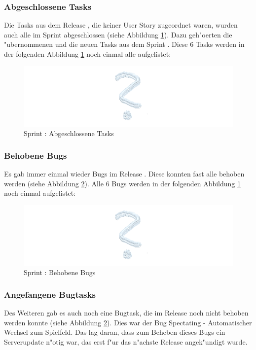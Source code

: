 \documentclass[12pt, titlepage]{scrartcl}
\newcommand{\RN}[1]{%
	\textup{\uppercase\expandafter{\romannumeral#1}}%
}
\begin{document}
    		\subsubsection{Abgeschlossene Tasks}
    			Die Tasks aus dem Release \RN{3}, die keiner User Story zugeordnet waren, wurden auch alle im Sprint \RN{5} abgeschlossen (siehe Abbildung \ref{Done_Tasks_6}). Dazu geh"oerten die "ubernommenen und die neuen Tasks aus dem Sprint \RN{6}. Diese 6 Tasks werden in der folgenden Abbildung \ref{Done_Tasks_6} noch einmal alle aufgelistet:
    			\begin{figure}[H]
    				\centering
    				\includegraphics[width=\textwidth]{images/sprintVI/doneTasks.png}
    				\caption{Sprint \RN{6}: Abgeschlossene Tasks}
    				\label{Done_Tasks_6}
    			\end{figure}
    		\subsubsection{Behobene Bugs}
    			Es gab immer einmal wieder Bugs im Release \RN{3}. Diese konnten fast alle behoben werden (siehe Abbildung \ref{Fixed_Bugs_6}). Alle 6 Bugs werden in der folgenden Abbildung \ref{Done_Tasks_6} noch einmal aufgelistet:
    			\begin{figure}[H]
    				\centering
    				\includegraphics[width=\textwidth]{images/sprintVI/bugs.png}
    				\caption{Sprint \RN{6}: Behobene Bugs}
    				\label{Fixed_Bugs_6}
    			\end{figure}
    		\subsubsection{Angefangene Bugtasks}
    			Des Weiteren gab es auch noch eine Bugtask, die im Release \RN{3} noch nicht behoben werden konnte (siehe Abbildung \ref{Fixed_Bugs_6}). Dies war der Bug \glqq Spectating - Automatischer Wechsel zum Spielfeld\grqq. Das lag daran, dass zum Beheben dieses Bugs ein Serverupdate n"otig war, das erst f"ur das n"achste Release angek"undigt wurde.
\end{document}
